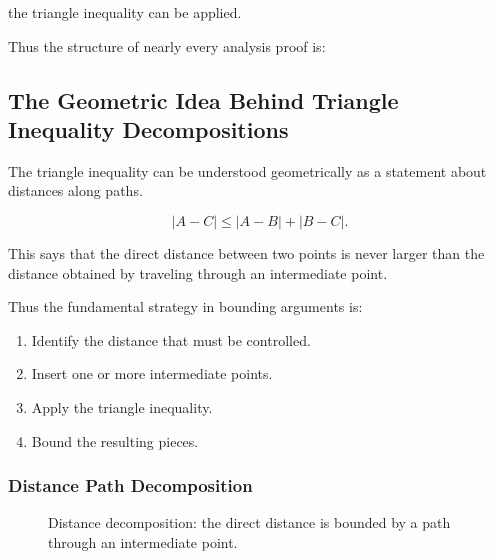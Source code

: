 the triangle inequality can be applied.

Thus the structure of nearly every analysis proof is:

\subsection{The Geometric Idea Behind Triangle Inequality Decompositions}
\label{sec:triangle-inequality-geometry}

The triangle inequality can be understood geometrically as a statement
about distances along paths.

\begin{equation}
|A-C| \le |A-B| + |B-C|.
\end{equation}

This says that the direct distance between two points is never larger
than the distance obtained by traveling through an intermediate point.

Thus the fundamental strategy in bounding arguments is:

\begin{enumerate}
\item Identify the distance that must be controlled.
\item Insert one or more intermediate points.
\item Apply the triangle inequality.
\item Bound the resulting pieces.
\end{enumerate}

\bigskip

\subsubsection*{Distance Path Decomposition}

\begin{figure}[h]
\centering
{}

\caption{Distance decomposition: the direct distance is bounded by a path
through an intermediate point.}
\end{figure}

